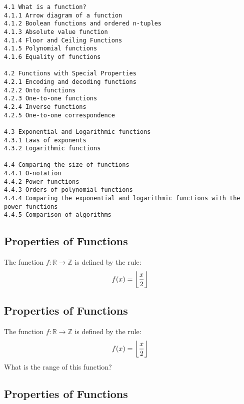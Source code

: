 \documentclass[a4paper,12pt]{article}
\begin{document}
\begin{verbatim}
4.1 What is a function?      
4.1.1 Arrow diagram of a function   
4.1.2 Boolean functions and ordered n-tuples   
4.1.3 Absolute value function   
4.1.4 Floor and Ceiling Functions    
4.1.5 Polynomial functions    
4.1.6 Equality of functions  

4.2 Functions with Special Properties    
4.2.1 Encoding and decoding functions    
4.2.2 Onto functions     
4.2.3 One-to-one functions    
4.2.4 Inverse functions     
4.2.5 One-to-one correspondence   

4.3 Exponential and Logarithmic functions    
4.3.1 Laws of exponents     
4.3.2 Logarithmic functions

4.4 Comparing the size of functions    
4.4.1 O-notation     
4.4.2 Power functions    
4.4.3 Orders of polynomial functions    
4.4.4 Comparing the exponential and logarithmic functions with the power functions
4.4.5 Comparison of algorithms 
\end{verbatim}


\newpage



\subsection{Properties of Functions}

The function $f : \mathbb{R} \rightarrow \mathbb{Z}$ is defined by the rule:
\[f(x) = \bigg\lfloor  {x \over 2}\bigg\rfloor \]






\subsection{Properties of Functions}

The function $f : \mathbb{R} \rightarrow \mathbb{Z}$ is defined by the rule:
\[f(x) = \bigg\lfloor  {x \over 2}\bigg\rfloor \]
What is the range of this function?




\subsection{Properties of Functions}
\end{document}
